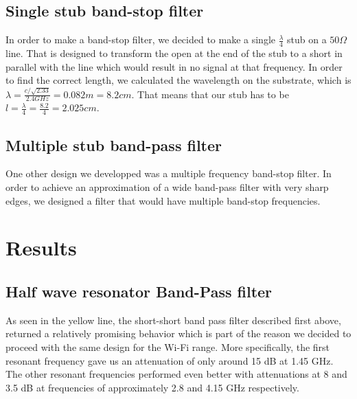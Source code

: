\documentclass[letterpaper, 11pt, twocolumn]{article}
\begin{document}

\subsection{Single stub band-stop filter}
In order to make a band-stop filter, we decided to make a single \(\frac{\lambda}{4}\) stub on a \(50 \Omega\) line. That is designed to transform the open at the end of the stub to a short in parallel with the line which would result in no signal at that frequency. In order to find the correct length, we calculated the wavelength on the substrate, which is \(\lambda=\frac{c/\sqrt{2.33}}{2.4GHz}=0.082m=8.2cm\). That means that our stub has to be \(l=\frac{\lambda}{4}=\frac{8.2}{4}=2.025cm\).
\subsection{Multiple stub band-pass filter}
One other design we developped was a multiple frequency band-stop filter. In order to achieve an approximation of a wide band-pass filter with very sharp edges, we designed a filter that would have multiple band-stop frequencies. 
\section{Results}

\subsection{Half wave resonator Band-Pass filter}
As seen in the yellow line, the short-short band pass filter described first above, returned a relatively promising behavior which is part of the reason we decided to proceed with the same design for the Wi-Fi range. More specifically, the first resonant frequency gave us an attenuation of only around 15 dB at 1.45 GHz. The other resonant frequencies performed even better with attenuations at 8 and 3.5 dB at frequencies of approximately 2.8 and 4.15 GHz respectively.
\end{document}
